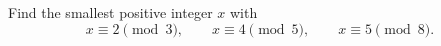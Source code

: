 Find the smallest positive integer $x$ with
\[x\equiv2\pmod3,\qquad x\equiv4\pmod5,\qquad x\equiv5\pmod8.\]
